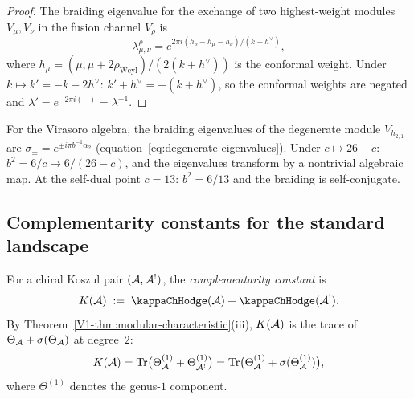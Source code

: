 \begin{proof}
The braiding eigenvalue for the exchange of two highest-weight modules
$V_\mu, V_\nu$ in the fusion channel $V_\rho$ is
\[
\lambda_{\mu,\nu}^\rho
= e^{2\pi i (h_\rho - h_\mu - h_\nu)/(k + h^\vee)},
\]
where $h_\mu = (\mu, \mu + 2\rho_{\mathrm{Weyl}})/(2(k + h^\vee))$ is
the conformal weight. Under $k \mapsto k' = -k - 2h^\vee$:
$k' + h^\vee = -(k + h^\vee)$, so the conformal weights are negated
and $\lambda' = e^{-2\pi i(\cdots)} = \lambda^{-1}$.
\end{proof}

\begin{remark}
For the Virasoro algebra, the braiding eigenvalues of the degenerate
module $V_{h_{2,1}}$ are $\sigma_\pm = e^{\pm i\pi b^{-1}\alpha_2}$
(equation~\eqref{eq:degenerate-eigenvalues}). Under $c \mapsto 26-c$:
$b^2 = 6/c \mapsto 6/(26-c)$, and the eigenvalues transform by a
nontrivial algebraic map. At the self-dual point $c = 13$:
$b^2 = 6/13$ and the braiding is self-conjugate.
\end{remark}

%
%

\subsection{Complementarity constants for the standard landscape}
\label{subsec:thqg-IV-complementarity-constant}

\begin{definition}
\label{def:thqg-IV-complementarity-constant}
For a chiral Koszul pair $(\mathcal{A}, \mathcal{A}^!)$, the
\emph{complementarity constant} is
\begin{equation}%
K(\cA)
\;:=\;
\kappaChHodge(\cA) + \kappaChHodge(\cA^!).
\end{equation}
By Theorem~\ref{V1-thm:modular-characteristic}\textup{(}iii\textup{)},
$K(\mathcal{A})$ is the trace of
$\Theta_{\mathcal{A}} + \sigma(\Theta_{\mathcal{A}})$ at degree~$2$:
\[
K(\mathcal{A})
= \operatorname{Tr}\bigl(\Theta_{\mathcal{A}}^{(1)} + \Theta_{\mathcal{A}^!}^{(1)}\bigr)
= \operatorname{Tr}\bigl(\Theta_{\mathcal{A}}^{(1)} + \sigma(\Theta_{\mathcal{A}}^{(1)})\bigr),
\]
where $\Theta^{(1)}$ denotes the genus-$1$ component.
\end{definition}

